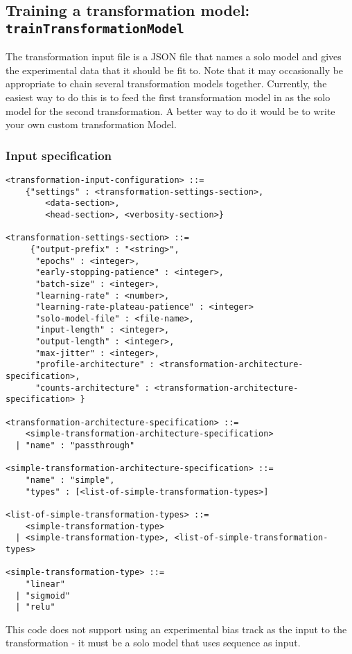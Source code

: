 \documentclass{article}
\begin{document}
\newpage

\subsection{Training a transformation model: \texttt{trainTransformationModel}}\label{prog:trainTransformationModel}

The transformation input file is a JSON file that names a solo model and gives the experimental
data that it should be fit to.
Note that it may occasionally be appropriate to chain several transformation models together.
Currently, the easiest way to do this is to feed the first transformation model in as the solo
model for the second transformation. A better way to do it would be to write your own custom
transformation Model.

\subsubsection{Input specification}
\begin{lstlisting}
<transformation-input-configuration> ::=
    {"settings" : <transformation-settings-section>,
        <data-section>,
        <head-section>, <verbosity-section>}

<transformation-settings-section> ::=
     {"output-prefix" : "<string>",
      "epochs" : <integer>,
      "early-stopping-patience" : <integer>,
      "batch-size" : <integer>,
      "learning-rate" : <number>,
      "learning-rate-plateau-patience" : <integer>
      "solo-model-file" : <file-name>,
      "input-length" : <integer>,
      "output-length" : <integer>,
      "max-jitter" : <integer>,
      "profile-architecture" : <transformation-architecture-specification>,
      "counts-architecture" : <transformation-architecture-specification> }

<transformation-architecture-specification> ::=
    <simple-transformation-architecture-specification>
  | "name" : "passthrough"

<simple-transformation-architecture-specification> ::=
    "name" : "simple",
    "types" : [<list-of-simple-transformation-types>]

<list-of-simple-transformation-types> ::=
    <simple-transformation-type>
  | <simple-transformation-type>, <list-of-simple-transformation-types>

<simple-transformation-type> ::=
    "linear"
  | "sigmoid"
  | "relu"
\end{lstlisting}

This code does not support using an experimental bias track as the input to the
transformation - it must be a solo model that uses sequence as input.
\end{document}
